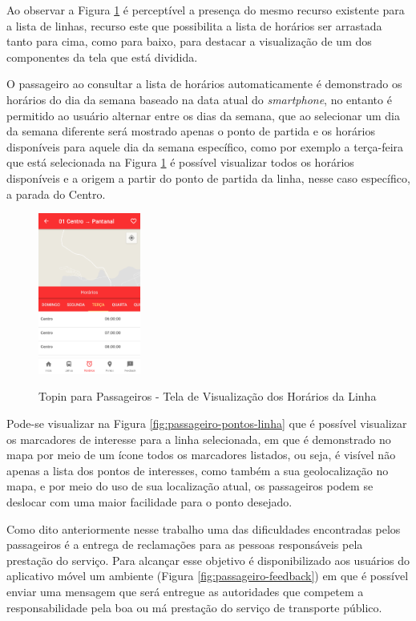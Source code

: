 {{{{{{{Ao observar a Figura \ref{fig:passageiro-horarios-linha} é perceptível a presença do mesmo recurso existente
para a lista de linhas, recurso este que possibilita a lista de horários ser arrastada tanto para cima, como
para baixo, para destacar a visualização de um dos componentes da tela que está dividida.

O passageiro ao consultar a lista de horários automaticamente é demonstrado os horários do dia da semana baseado
na data atual do \textit{smartphone}, no entanto é permitido ao usuário alternar entre os dias da semana, que ao
selecionar um dia da semana diferente será mostrado apenas o ponto de partida e os horários disponíveis para aquele
dia da semana específico, como por exemplo a terça-feira que está selecionada na Figura \ref{fig:passageiro-horarios-linha}
é possível visualizar todos os horários disponíveis e a origem a partir do ponto de partida da linha, nesse
caso específico, a parada do Centro.

\begin{figure}[H]
\caption{Topin para Passageiros - Tela de Visualização dos Horários da Linha}
\centering
\includegraphics[width=0.3\textwidth]{imagens/horarios-linha.png}
\label{fig:passageiro-horarios-linha}
\end{figure}

Pode-se visualizar na Figura \ref{fig:passageiro-pontos-linha} que é possível visualizar os marcadores de interesse para a linha selecionada, em que é demonstrado no mapa por meio de um ícone todos os marcadores listados, ou seja, é visível não apenas a lista dos pontos de interesses, como também a sua geolocalização no mapa, e por meio do uso de sua localização atual, os passageiros podem se deslocar com uma maior facilidade para o ponto desejado.

Como dito anteriormente nesse trabalho uma das dificuldades encontradas pelos passageiros é a entrega de reclamações
para as pessoas responsáveis pela prestação do serviço. Para alcançar esse objetivo é disponibilizado aos usuários
do aplicativo móvel um ambiente (Figura \ref{fig:passageiro-feedback}) em que é possível enviar uma mensagem que
será entregue as autoridades que competem a responsabilidade pela boa ou má prestação do serviço de transporte público.

}}}}}}}
